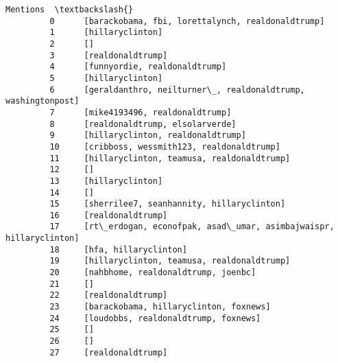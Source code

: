 \documentclass[11pt]{article}
\begin{document}
\begin{Verbatim}[commandchars=\\\{\}]
                                                                              Mentions  \textbackslash{}
         0      [barackobama, fbi, lorettalynch, realdonaldtrump]                        
         1      [hillaryclinton]                                                         
         2      []                                                                       
         3      [realdonaldtrump]                                                        
         4      [funnyordie, realdonaldtrump]                                            
         5      [hillaryclinton]                                                         
         6      [geraldanthro, neilturner\_, realdonaldtrump, washingtonpost]             
         7      [mike4193496, realdonaldtrump]                                           
         8      [realdonaldtrump, elsolarverde]                                          
         9      [hillaryclinton, realdonaldtrump]                                        
         10     [cribboss, wessmith123, realdonaldtrump]                                 
         11     [hillaryclinton, teamusa, realdonaldtrump]                               
         12     []                                                                       
         13     [hillaryclinton]                                                         
         14     []                                                                       
         15     [sherrilee7, seanhannity, hillaryclinton]                                
         16     [realdonaldtrump]                                                        
         17     [rt\_erdogan, econofpak, asad\_umar, asimbajwaispr, hillaryclinton]        
         18     [hfa, hillaryclinton]                                                    
         19     [hillaryclinton, teamusa, realdonaldtrump]                               
         20     [nahbhome, realdonaldtrump, joenbc]                                      
         21     []                                                                       
         22     [realdonaldtrump]                                                        
         23     [barackobama, hillaryclinton, foxnews]                                   
         24     [loudobbs, realdonaldtrump, foxnews]                                     
         25     []                                                                       
         26     []                                                                       
         27     [realdonaldtrump]                                                        

\end{Verbatim}
\end{document}
